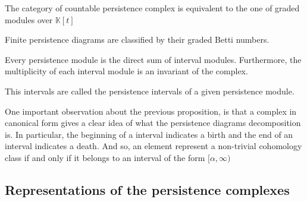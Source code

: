 \begin{proposition}\cite{zomcar2002}
The category of countable persistence complex is equivalent to the one of graded modules over
$\mathbb{K}[t]$
\end{proposition}

\begin{proposition}\cite{zomcar2002}
Finite persistence diagrams are classified by 
their graded Betti numbers.

\end{proposition}

\begin{proposition}\cite{zomcar2002}
Every persistence module is the direct sum of interval modules.
Furthermore, the multiplicity of each interval module is an invariant
of the complex.

This intervals are called the persistence intervals of a given 
persistence module.
\end{proposition}


One important observation about the previous proposition,
is that a complex in canonical form gives a clear idea of what the persistence 
diagrams decomposition is. In particular, the beginning of a interval
indicates a birth and the end of an interval indicates a death. And
so, an element represent a non-trivial cohomology class if and only if
it belongs to an interval of the form $[\alpha,\infty)$

\subsection{Representations of the persistence complexes}

%


%

%
%



